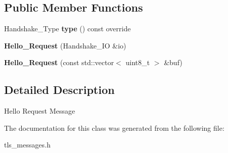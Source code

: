 \subsection*{Public Member Functions}
\begin{DoxyCompactItemize}
\item 
\mbox{\label{class_botan_1_1_t_l_s_1_1_hello___request_a9adaf1b83346d623b83e3c21df7f7248}} 
Handshake\+\_\+\+Type {\bfseries type} () const override
\item 
\mbox{\label{class_botan_1_1_t_l_s_1_1_hello___request_a9dc95c12bd9c3268d5b6be0af003efa5}} 
{\bfseries Hello\+\_\+\+Request} (Handshake\+\_\+\+IO \&io)
\item 
\mbox{\label{class_botan_1_1_t_l_s_1_1_hello___request_a05fdf440561c5da3efa6ad487d5b0f4a}} 
{\bfseries Hello\+\_\+\+Request} (const std\+::vector$<$ uint8\+\_\+t $>$ \&buf)
\end{DoxyCompactItemize}


\subsection{Detailed Description}
Hello Request Message 

The documentation for this class was generated from the following file\+:\begin{DoxyCompactItemize}
\item 
tls\+\_\+messages.\+h\end{DoxyCompactItemize}
